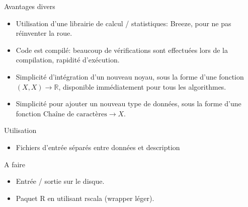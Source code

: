 \documentclass{beamer}
\begin{document}
\begin{frame}{Avantages divers}
	\begin{itemize}
		\item Utilisation d'une librairie de calcul / statistiques: Breeze, pour ne pas réinventer la roue.
		\item Code est compilé: beaucoup de vérifications sont effectuées lors de la compilation, rapidité d'exécution.
		\item Simplicité d'intégration d'un nouveau noyau, sous la forme d'une fonction $(X, X) \rightarrow \mathbb{R}$, disponible immédiatement pour tous les algorithmes.
		\item Simplicité pour ajouter un nouveau type de données, sous la forme d'une fonction $\text{Chaîne de caractères} \rightarrow X$.
	\end{itemize}
\end{frame}

\begin{frame}{Utilisation}
	\begin{itemize}
		\item Fichiers d'entrée séparés entre données et description
	\end{itemize}
\end{frame}

\begin{frame}{A faire}
	\begin{itemize}
		\item Entrée / sortie sur le disque.
		\item Paquet R en utilisant rscala (wrapper léger).
	\end{itemize}
\end{frame}
\end{document}
